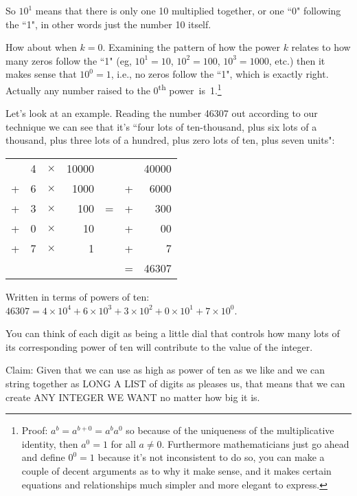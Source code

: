 \documentclass{article}
\begin{document}
So $10^1$ means that there is only one 10 multiplied together, or one ``0" following the ``1",
in other words just the number 10 itself.

How about when $k=0$.
Examining the pattern of how the power $k$ relates to how many zeros follow the ``1"
(eg, $10^1=10$, $10^2=100$, $10^3=1000$,
etc.) then it makes sense that $10^0=1$,
i.e., no zeros follow the ``1", which is exactly right.
Actually any number raised to the 0\textsuperscript{th} power~is~1.\footnote{Proof:
 $a^b=a^{b+0}=a^ba^0$ so because of the uniqueness of the multiplicative identity, then $a^0=1$ for all $a\ne0$. Furthermore
 mathematicians just go ahead and define $0^0=1$ because it's not inconsistent to do so, you can make a couple of decent arguments as to why
 it make sense, and it makes certain equations and relationships much simpler and more elegant to express.}

Let's look at an example.
Reading the number 46307 out according to our technique we can see
that it's ``four lots of ten-thousand,
plus six lots of a thousand, plus three lots of a hundred,
plus zero lots of ten, plus seven units":

\begin{center}
\begin{tabular}{r r r r c r r}
\phantom & 4 & $\times$ & 10000 & \phantom & \phantom & 40000\\
+ & 6 & $\times$ & 1000 & \phantom & + & 6000\\
+ & 3 & $\times$ & 100 & \; \; = \; \; & + & 300\\
+ & 0 & $\times$ & 10 & \phantom & + & 00\\
+ & 7 & $\times$ & 1 & \phantom & + & 7\\
\cline{6-7}
\phantom & \phantom & \phantom & \phantom & \phantom & = & 46307
\end{tabular}
\end{center}

Written in terms of powers of ten: $46307=4\times10^4+6\times10^3+3\times10^2+0\times10^1+7\times10^0$.

You can think of each digit as being a little dial that controls how many lots
of its corresponding power of ten will contribute to the value of the integer.

Claim: Given that we can use as high as power of ten as we like
and we can string together as LONG A LIST of digits as pleases us,
that means that we can create ANY INTEGER WE WANT no matter how big it is.
\end{document}
